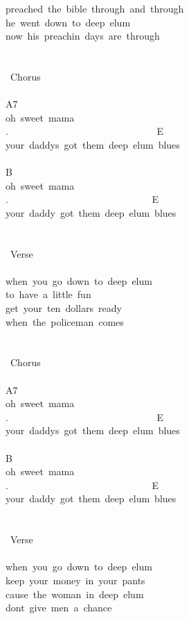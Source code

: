 {preached\ the\ bible\ through\ and\ through\\
he\ went\ down\ to\ deep\ elum\\
now\ his\ preachin\ days\ are\ through\\
\\
\\
\lbrack\ Chorus\rbrack\\
\\
A7\\
oh\ sweet\ mama\\
. \ \ \ \ \ \ \ \ \ \ \ \ \ \ \ \ \ \ \ \ \ \ \ \ \ \ \ \ \ \ E\\
your\ daddys\ got\ them\ deep\ elum\ blues\\
\\
B\\
oh\ sweet\ mama\\
. \ \ \ \ \ \ \ \ \ \ \ \ \ \ \ \ \ \ \ \ \ \ \ \ \ \ \ \ \ E\\
your\ daddy\ got\ them\ deep\ elum\ blues\\
\\
\\
\lbrack\ Verse\rbrack\\
\\
when\ you\ go\ down\ to\ deep\ elum\\
to\ have\ a\ little\ fun\\
get\ your\ ten\ dollars\ ready\\
when\ the\ policeman\ comes\\
\\
\\
\lbrack\ Chorus\rbrack\\
\\
A7\\
oh\ sweet\ mama\\
. \ \ \ \ \ \ \ \ \ \ \ \ \ \ \ \ \ \ \ \ \ \ \ \ \ \ \ \ \ \ E\\
your\ daddys\ got\ them\ deep\ elum\ blues\\
\\
B\\
oh\ sweet\ mama\\
. \ \ \ \ \ \ \ \ \ \ \ \ \ \ \ \ \ \ \ \ \ \ \ \ \ \ \ \ \ E\\
your\ daddy\ got\ them\ deep\ elum\ blues\\
\\
\\
\lbrack\ Verse\rbrack\\
\\
when\ you\ go\ down\ to\ deep\ elum\\
keep\ your\ money\ in\ your\ pants\\
cause\ the\ woman\ in\ deep\ elum\\
dont\ give\ men\ a\ chance\\}
